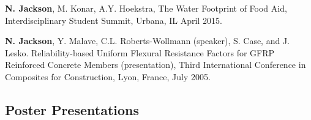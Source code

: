 \documentclass{article}[12pt]
\begin{document}
\begin{etaremune}[]
		\item \textbf{N. Jackson}, M. Konar, A.Y. Hoekstra, The Water Footprint of Food Aid, Interdisciplinary Student Summit, Urbana, IL April 2015. 
		
		\item \textbf{N. Jackson}, Y. Malave, C.L. Roberts-Wollmann (speaker), S. Case, and J. Lesko. Reliability-based Uniform Flexural Resistance Factors for GFRP Reinforced Concrete Members (presentation), Third International Conference in Composites for Construction, Lyon, France, July 2005. 
		
	\end{etaremune}
	
	\vspace{-1.5em}
	\subsection*{Poster Presentations}
	
\end{document}
